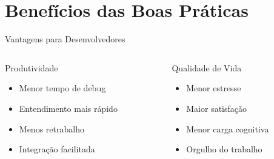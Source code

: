 \documentclass[10pt, aspectratio=169]{beamer}
\begin{document}
\section{Benefícios das Boas Práticas}
\begin{frame}{Vantagens para Desenvolvedores}
\begin{columns}
\begin{column}{0.5\textwidth}
\begin{block}{Produtividade}
\begin{itemize}
    \item Menor tempo de debug
    \item Entendimento mais rápido
    \item Menos retrabalho
    \item Integração facilitada
\end{itemize}
\end{block}
\end{column}
\begin{column}{0.5\textwidth}
\begin{block}{Qualidade de Vida}
\begin{itemize}
    \item Menor estresse
    \item Maior satisfação
    \item Menor carga cognitiva
    \item Orgulho do trabalho
\end{itemize}
\end{block}
\end{column}
\end{columns}

\vspace{0.5cm}
\begin{center}
\end{center}
\end{frame}
\end{document}
